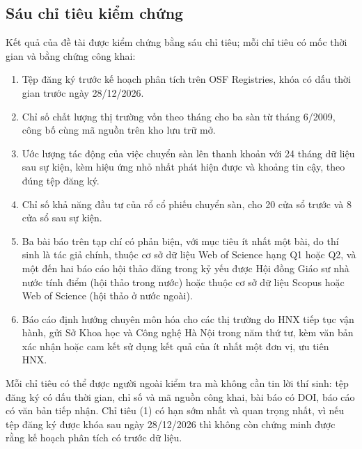 \subsection*{Sáu chỉ tiêu kiểm chứng}

Kết quả của đề tài được kiểm chứng bằng sáu chỉ tiêu; mỗi chỉ tiêu có mốc thời gian và bằng chứng công khai:

\begin{enumerate}[label=(\arabic*)]
\item Tệp đăng ký trước kế hoạch phân tích trên OSF Registries, khóa có dấu thời gian trước ngày 28/12/2026.
\item Chỉ số chất lượng thị trường vốn theo tháng cho ba sàn từ tháng 6/2009, công bố cùng mã nguồn trên kho lưu trữ mở.
\item Ước lượng tác động của việc chuyển sàn lên thanh khoản với 24 tháng dữ liệu sau sự kiện, kèm hiệu ứng nhỏ nhất phát hiện được và khoảng tin cậy, theo đúng tệp đăng ký.
\item Chỉ số khả năng đầu tư của rổ cổ phiếu chuyển sàn, cho 20 cửa sổ trước và 8 cửa sổ sau sự kiện.
\item Ba bài báo trên tạp chí có phản biện, với mục tiêu ít nhất một bài, do thí sinh là tác giả chính, thuộc cơ sở dữ liệu Web of Science hạng Q1 hoặc Q2, và một đến hai báo cáo hội thảo đăng trong kỷ yếu được Hội đồng Giáo sư nhà nước tính điểm (hội thảo trong nước) hoặc thuộc cơ sở dữ liệu Scopus hoặc Web of Science (hội thảo ở nước ngoài).
\item Báo cáo định hướng chuyên môn hóa cho các thị trường do HNX tiếp tục vận hành, gửi Sở Khoa học và Công nghệ Hà Nội trong năm thứ tư, kèm văn bản xác nhận hoặc cam kết sử dụng kết quả của ít nhất một đơn vị, ưu tiên HNX.
\end{enumerate}

Mỗi chỉ tiêu có thể được người ngoài kiểm tra mà không cần tin lời thí sinh: tệp đăng ký có dấu thời gian, chỉ số và mã nguồn công khai, bài báo có DOI, báo cáo có văn bản tiếp nhận. Chỉ tiêu (1) có hạn sớm nhất và quan trọng nhất, vì nếu tệp đăng ký được khóa sau ngày 28/12/2026 thì không còn chứng minh được rằng kế hoạch phân tích có trước dữ liệu.
